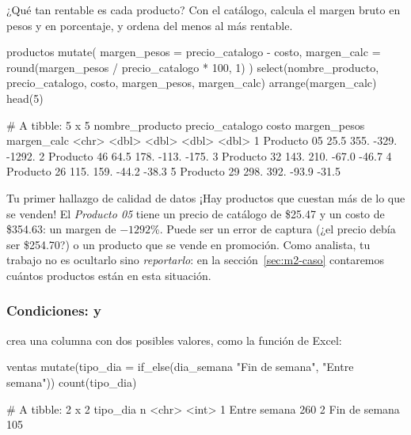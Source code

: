 \begin{ejemplo}{¿Qué tan rentable es cada producto?}
Con el catálogo, calcula el margen bruto en pesos y en porcentaje, y
ordena del menos al más rentable.
\end{ejemplo}

\begin{rcode}
productos %
  mutate(
    margen_pesos = precio_catalogo - costo,
    margen_calc  = round(margen_pesos / precio_catalogo * 100, 1)
  ) %
  select(nombre_producto, precio_catalogo, costo,
         margen_pesos, margen_calc) %
  arrange(margen_calc) %
  head(5)
\end{rcode}
\begin{rsalida}
# A tibble: 5 x 5
  nombre_producto precio_catalogo costo margen_pesos margen_calc
  <chr>                     <dbl> <dbl>        <dbl>       <dbl>
1 Producto 05                25.5  355.       -329.      -1292. 
2 Producto 46                64.5  178.       -113.       -175. 
3 Producto 32               143.   210.        -67.0       -46.7
4 Producto 26               115.   159.        -44.2       -38.3
5 Producto 29               298.   392.        -93.9       -31.5
\end{rsalida}

\begin{negocio}{Tu primer hallazgo de calidad de datos}
¡Hay productos que cuestan más de lo que se venden! El \emph{Producto 05}
tiene un precio de catálogo de \$25.47 y un costo de \$354.63: un margen de
$-1292$\%. Puede ser un error de captura (¿el precio debía ser \$254.70?) o un
producto que se vende en promoción. Como analista, tu trabajo no es ocultarlo
sino \emph{reportarlo}: en la sección~\ref{sec:m2-caso} contaremos cuántos
productos están en esta situación.
\end{negocio}

\subsubsection{Condiciones: \texorpdfstring{}{if\_else()} y \texorpdfstring{}{case\_when()}}

 crea
una columna con dos posibles valores, como la función  de
Excel:

\begin{rcode}
ventas %
  mutate(tipo_dia = if_else(dia_semana %
                            "Fin de semana", "Entre semana")) %
  count(tipo_dia)
\end{rcode}
\begin{rsalida}
# A tibble: 2 x 2
  tipo_dia          n
  <chr>         <int>
1 Entre semana    260
2 Fin de semana   105
\end{rsalida}

